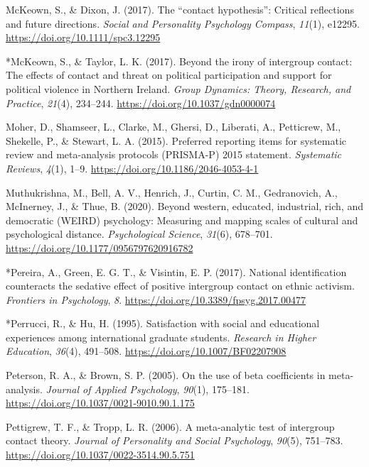 \documentclass[12pt, letterpaper]{article}
\begin{document}
\leavevmode\hypertarget{ref-mckeown_contact_2017}{}%
McKeown, S., \& Dixon, J. (2017). The ``contact hypothesis'': Critical
reflections and future directions. \emph{Social and Personality
Psychology Compass}, \emph{11}(1), e12295.
\url{https://doi.org/10.1111/spc3.12295}

\leavevmode\hypertarget{ref-1376}{}%
*McKeown, S., \& Taylor, L. K. (2017). Beyond the irony of intergroup
contact: The effects of contact and threat on political participation
and support for political violence in Northern Ireland. \emph{Group
Dynamics: Theory, Research, and Practice}, \emph{21}(4), 234--244.
\url{https://doi.org/10.1037/gdn0000074}

\leavevmode\hypertarget{ref-moher_preferred_2015}{}%
Moher, D., Shamseer, L., Clarke, M., Ghersi, D., Liberati, A.,
Petticrew, M., Shekelle, P., \& Stewart, L. A. (2015). Preferred
reporting items for systematic review and meta-analysis protocols
(PRISMA-P) 2015 statement. \emph{Systematic Reviews}, \emph{4}(1), 1--9.
\url{https://doi.org/10.1186/2046-4053-4-1}

\leavevmode\hypertarget{ref-muthukrishna_beyond_2020}{}%
Muthukrishna, M., Bell, A. V., Henrich, J., Curtin, C. M., Gedranovich,
A., McInerney, J., \& Thue, B. (2020). Beyond western, educated,
industrial, rich, and democratic (WEIRD) psychology: Measuring and
mapping scales of cultural and psychological distance.
\emph{Psychological Science}, \emph{31}(6), 678--701.
\url{https://doi.org/10.1177/0956797620916782}

\leavevmode\hypertarget{ref-4004}{}%
*Pereira, A., Green, E. G. T., \& Visintin, E. P. (2017). National
identification counteracts the sedative effect of positive intergroup
contact on ethnic activism. \emph{Frontiers in Psychology}, \emph{8}.
\url{https://doi.org/10.3389/fpsyg.2017.00477}

\leavevmode\hypertarget{ref-823}{}%
*Perrucci, R., \& Hu, H. (1995). Satisfaction with social and
educational experiences among international graduate students.
\emph{Research in Higher Education}, \emph{36}(4), 491--508.
\url{https://doi.org/10.1007/BF02207908}

\leavevmode\hypertarget{ref-peterson_use_2005}{}%
Peterson, R. A., \& Brown, S. P. (2005). On the use of beta coefficients
in meta-analysis. \emph{Journal of Applied Psychology}, \emph{90}(1),
175--181. \url{https://doi.org/10.1037/0021-9010.90.1.175}

\leavevmode\hypertarget{ref-pettigrew_meta-analytic_2006}{}%
Pettigrew, T. F., \& Tropp, L. R. (2006). A meta-analytic test of
intergroup contact theory. \emph{Journal of Personality and Social
Psychology}, \emph{90}(5), 751--783.
\url{https://doi.org/10.1037/0022-3514.90.5.751}
\end{document}

